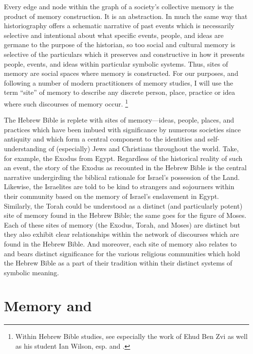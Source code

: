 Every edge and node within the graph of a society's collective memory is the product of memory construction. It is an abstraction. In much the same way that historiography offers a schematic narrative of past events which is necessarily selective and intentional about what specific events, people, and ideas are germane to the purpose of the historian, so too social and cultural memory is selective of the particulars which it preserves and constructive in how it presents people, events, and ideas within particular symbolic systems. Thus, sites of memory are social spaces where memory is constructed. For our purposes, and following a number of modern practitioners of memory studies, I will use the term ``site'' of memory to describe any discrete person, place, practice or idea where such discourses of memory occur.%
    \footnote{%
        Within Hebrew Bible studies, see especially the work of Ehud Ben Zvi as well as his student Ian Wilson, esp.
        \cite[72--74]{benzvi_st2017} and 
        \cite[25--26]{wilson2017}.}

The Hebrew Bible is replete with sites of memory---ideas, people, places, and practices which have been imbued with significance by numerous societies since antiquity and which form a central component to the identities and self-understanding of (especially) Jews and Christians throughout the world. Take, for example, the Exodus from Egypt. Regardless of the historical reality of such an event, the story of the Exodus as recounted in the Hebrew Bible is the central narrative undergirding the biblical rationale for Israel's possession of the Land. Likewise, the Israelites are told to be kind to strangers and sojourners within their community based on the memory of Israel's enslavement in Egypt. Similarly, the Torah could be understood as a distinct (and particularly potent) site of memory found in the Hebrew Bible; the same goes for the figure of Moses. Each of these sites of memory (the Exodus, Torah, and Moses) are distinct but they also exhibit clear relationships within the network of discourses which are found in the Hebrew Bible. And moreover, each site of memory also relates to and bears distinct significance for the various religious communities which hold the Hebrew Bible as a part of their tradition within their distinct systems of symbolic meaning. 

\section{Memory and \rwb}

